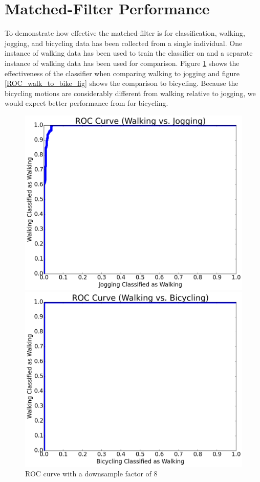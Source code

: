 \documentclass[journal]{IEEEtran}
\begin{document}
\section{Matched-Filter Performance}
%
To demonstrate how effective the matched-filter is for classification, walking, jogging, and bicycling data has been collected from a single individual. One instance of walking data has been used to train the classifier on and a separate instance of walking data has been used for comparison. Figure \ref{ROC_walk_to_run_fig} shows the effectiveness of the classifier when comparing walking to jogging and figure \ref{ROC_walk_to_bike_fig} shows the comparison to bicycling. Because the bicycling motions are considerably different from walking relative to jogging, we would expect better performance from for bicycling.
\begin{figure}[!tbp]
\RawFloats
  \centering
     \begin{minipage}[b]{0.45\textwidth}
        \includegraphics[angle=0,width=\textwidth]{ROC_walk_to_run.png}
        \caption{\label{ROC_walk_to_run_fig}ROC curve with a downsample factor of 8}
     \end{minipage}
     \hfill
     \begin{minipage}[b]{0.45\textwidth}
     \includegraphics[angle=0,width=\textwidth]{ROC_walk_to_bike.png}

\end{minipage}
\end{figure}
\end{document}
